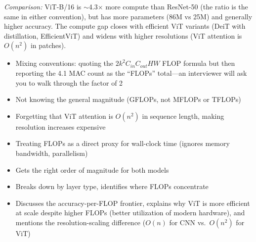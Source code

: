 \begin{interviewq}
\textit{Comparison:} ViT-B/16 is $\sim$4.3$\times$ more compute than ResNet-50 (the ratio is the same in either convention), but has more parameters (86M vs 25M) and generally higher accuracy. The compute gap closes with efficient ViT variants (DeiT with distillation, EfficientViT) and widens with higher resolutions (ViT attention is $O(n^2)$ in patches).

\redflags
\begin{itemize}
    \item Mixing conventions: quoting the $2 k^2 C_{in} C_{out} H W$ FLOP formula but then reporting the 4.1 MAC count as the ``FLOPs'' total---an interviewer will ask you to walk through the factor of 2
    \item Not knowing the general magnitude (GFLOPs, not MFLOPs or TFLOPs)
    \item Forgetting that ViT attention is $O(n^2)$ in sequence length, making resolution increases expensive
    \item Treating FLOPs as a direct proxy for wall-clock time (ignores memory bandwidth, parallelism)
\end{itemize}


\goodgreat
\begin{itemize}
    \item {} Gets the right order of magnitude for both models
    \item {} Breaks down by layer type, identifies where FLOPs concentrate
    \item {} Discusses the accuracy-per-FLOP frontier, explains why ViT is more efficient at scale despite higher FLOPs (better utilization of modern hardware), and mentions the resolution-scaling difference ($O(n)$ for CNN vs.\ $O(n^2)$ for ViT)
\end{itemize}

\end{interviewq}

